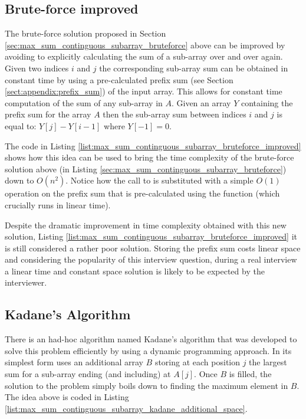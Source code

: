 \subsection{Brute-force improved}
\label{max_sum_continguous_subarray:sec:bruteforce_improved}
The brute-force solution proposed in Section \ref{sec:max_sum_continguous_subarray_bruteforce} above can be
improved by avoiding to explicitly calculating the sum of a sub-array over and over again.
Given two indices $i$ and $j$ the corresponding sub-array sum can be obtained in constant time by using a pre-calculated
prefix sum (see Section \ref{sect:appendix:prefix_sum}) of the input array.
This allows for constant time computation of the sum of any sub-array in $A$. Given an array $Y$ containing the prefix sum for the
array $A$ then the sub-array sum between indices $i$ and $j$ is equal to: $Y[j]-Y[i-1]$ where $Y[-1] = 0$.

The code in Listing \ref{list:max_sum_continguous_subarray_bruteforce_improved} shows how this idea can be used to bring the time complexity of the brute-force solution above (in Listing \ref{sec:max_sum_continguous_subarray_bruteforce}) down to $O(n^2)$. 
Notice how the call to  is substituted with a simple $O(1)$ operation on the prefix sum that is pre-calculated using the function  (which crucially runs in linear time).



Despite the dramatic improvement in time complexity obtained with this new solution, Listing
\ref{list:max_sum_continguous_subarray_bruteforce_improved} it is still considered a rather poor solution.
Storing the prefix sum costs linear space and  considering the  popularity of this interview question, during a real
interview a linear time and constant space solution is likely to be expected by the interviewer.

\subsection{Kadane's Algorithm}
\label{sec:kadane_algorithm}
There is an had-hoc algorithm named Kadane's algorithm that was developed to solve this problem efficiently by using a dynamic programming approach.
In its simplest form uses an additional array $B$ storing at each position $j$ the largest sum for a
sub-array ending (and including) at $A[j]$. Once $B$
is filled, the solution to the problem simply boils down to finding the maximum element in $B$. The idea above is coded 
in Listing \ref{list:max_sum_continguous_subarray_kadane_additional_space}.


